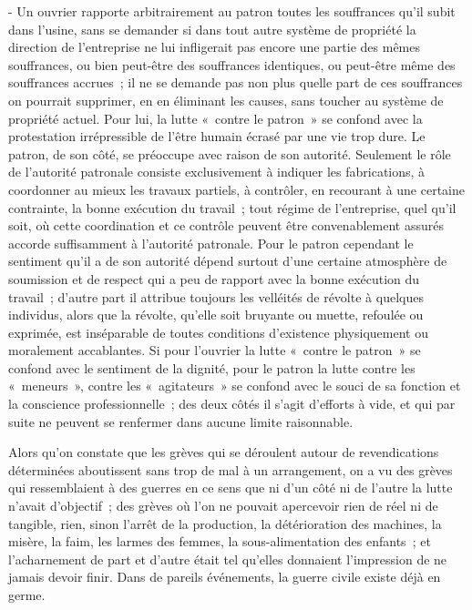 \documentclass[french,twoside]{book} %
\begin{document}
 - Un ouvrier rapporte arbitrairement au patron toutes les souffrances qu'il subit dans l'usine, sans se demander si dans tout autre système de propriété la direction de l'entreprise ne lui infligerait pas encore une partie des mêmes souffrances, ou bien peut-être des souffrances identiques, ou peut-être même des souffrances accrues ; il ne se demande pas non plus quelle part de ces souffrances on pourrait supprimer, en en éliminant les causes, sans toucher au système de propriété actuel. Pour lui, la lutte « contre le patron » se confond avec la protestation irrépressible de l'être humain écrasé par une vie trop dure. Le patron, de son côté, se préoccupe avec raison de son autorité. Seulement le rôle de l'autorité patronale consiste exclusivement à indiquer les fabrications, à coordonner au mieux les travaux partiels, à contrôler, en recourant à une certaine contrainte, la bonne exécution du travail ; tout régime de l'entreprise, quel qu'il soit, où cette coordination et ce contrôle peuvent être convenablement assurés accorde suffisamment à l'autorité patronale. Pour le patron cependant le sentiment qu'il a de son autorité dépend surtout d'une certaine atmosphère de soumission et de respect qui a peu de rapport avec la bonne exécution du travail ; d'autre part il attribue toujours les velléités de révolte à quelques individus, alors que la révolte, qu'elle soit bruyante ou muette, refoulée ou exprimée, est inséparable de toutes conditions d'existence physiquement ou moralement accablantes. Si pour l'ouvrier la lutte « contre le patron » se confond avec le sentiment de la dignité, pour le patron la lutte contre les « meneurs », contre les « agitateurs » se confond avec le souci de sa fonction et la conscience professionnelle ; des deux côtés il s'agit d'efforts à vide, et qui par suite ne peuvent se renfermer dans aucune limite raisonnable.\par
Alors qu'on constate que les grèves qui se déroulent autour de revendications déterminées aboutissent sans trop de mal à un arrangement, on a vu des grèves qui ressemblaient à des guerres en ce sens que ni d'un côté ni de l'autre la lutte n'avait d'objectif ; des grèves où l'on ne pouvait apercevoir rien de réel ni de tangible, rien, sinon l'arrêt de la production, la détérioration des machines, la misère, la faim, les larmes des femmes, la sous-alimentation des enfants ; et l'acharnement de part et d'autre était tel qu'elles donnaient l'impression de ne jamais devoir finir. Dans de pareils événements, la guerre civile existe déjà en germe.\par
\end{document}
